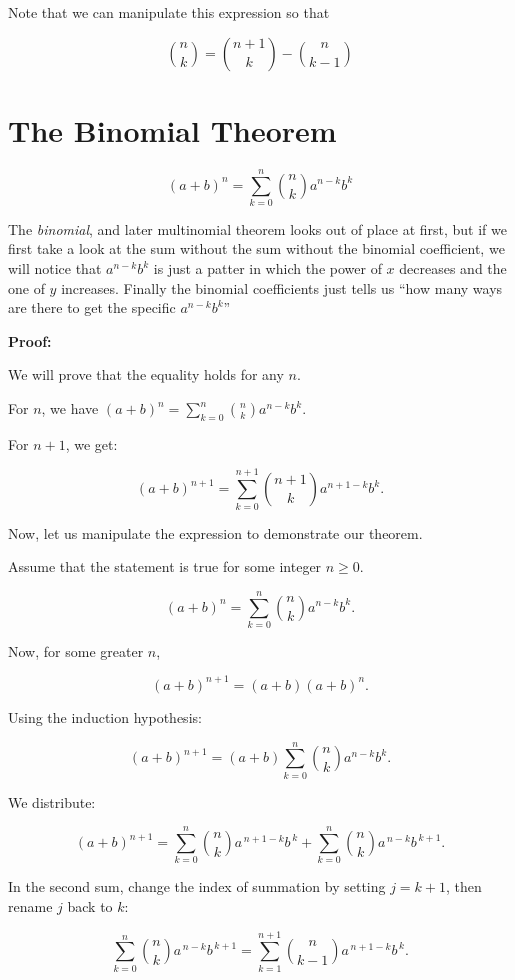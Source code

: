Note that we can manipulate this expression so that 

\[ 
   \binom{n}{k} = \binom{n + 1}{k} - \binom{n}{k  - 1} 
\]


\QED

\section{The Binomial Theorem}

\[
    {(a + b)}^n =\sum_{k = 0}^{n} \binom{n}{k}a^{n - k}b^k
\]

The \emph{binomial}, and later multinomial theorem looks out of place at first, but if we first take a look at the sum 
without the sum without the binomial coefficient, we will notice that \(a^{n - k}b^k\) is just a patter in which the 
power of \(x\) decreases and the one of \(y\) increases. Finally the binomial coefficients just tells us ``how many ways are there to get the 
specific \(a^{n - k}b^k\)''

\textbf{Proof:}

We will prove that the equality holds for any \(n\).

For \(n\), we have \( (a + b)^n = \sum_{k = 0}^{n} \binom{n}{k} a^{n - k} b^k \).

For \(n + 1\), we get:

\[
    (a + b)^{n + 1} =\sum_{k = 0}^{n + 1} \binom{n + 1}{k}a^{n + 1 - k}b^k.
\]

Now, let us manipulate the expression to demonstrate our theorem.

Assume that the statement is true for some integer \(n \ge 0\).

\[
    (a+b)^n = \sum_{k=0}^n \binom{n}{k} a^{n-k} b^{k}.
\]

Now, for some greater \(n\),

\[
    (a+b)^{n+1} = (a+b)(a+b)^n.
\]

Using the induction hypothesis:

\[
    (a+b)^{n+1} = (a+b) \sum_{k=0}^n \binom{n}{k} a^{n-k} b^{k}.
\]

We distribute:

\[
    (a+b)^{n+1} = \sum_{k=0}^n \binom{n}{k} a^{\,n+1-k} b^{\,k}
    + \sum_{k=0}^n \binom{n}{k} a^{\,n-k} b^{\,k+1}.
\]

In the second sum, change the index of summation by setting \(j = k + 1\), then rename \(j\) back to \(k\):

\[
    \sum_{k=0}^n \binom{n}{k} a^{\,n-k} b^{\,k+1}
    = \sum_{k=1}^{n+1} \binom{n}{k-1} a^{\,n+1-k} b^{\,k}.
\]

